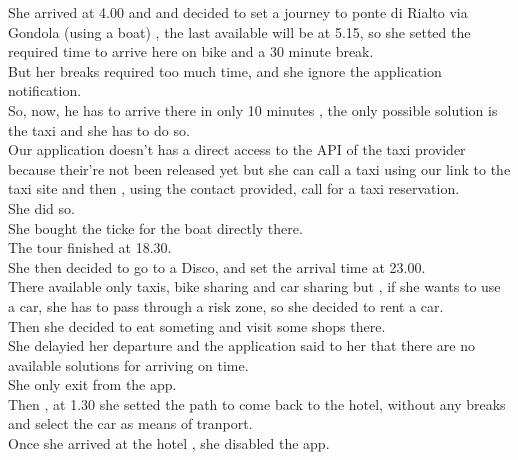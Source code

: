 \documentclass[a4paper]{book}
\begin{document}
She arrived at 4.00 and and decided to set a journey to ponte di Rialto via Gondola (using a boat) , the last available will be at 5.15, so she setted the required time to arrive here on bike and a 30 minute break.\\
But her breaks required too much time, and she ignore the application notification.\\
So, now, he has to arrive there in only 10 minutes , the only possible solution is the taxi and she has to do so.\\
Our application doesn't has a direct access to the API of the taxi provider because their're not been released yet but she can call a taxi using our link to the taxi site and then , using the contact provided, call for a taxi reservation.\\
She did so.\\
She bought the ticke for the boat directly there.\\
The tour finished at 18.30.\\
She then decided to go to a Disco, and set the arrival time at 23.00.\\
There available only taxis, bike sharing and car sharing but , if she wants to use a car, she has to pass through a risk zone, so she decided to rent a car.\\
Then she decided to eat someting and visit some shops there.\\
She delayied her departure and the application said to her that there are no available solutions for arriving on time.\\
She only exit from the app.\\
Then , at 1.30 she setted the path to come back to the hotel, without any breaks and select the car as means of tranport.\\
Once she arrived at the hotel , she disabled the app.\\
\end{document}
